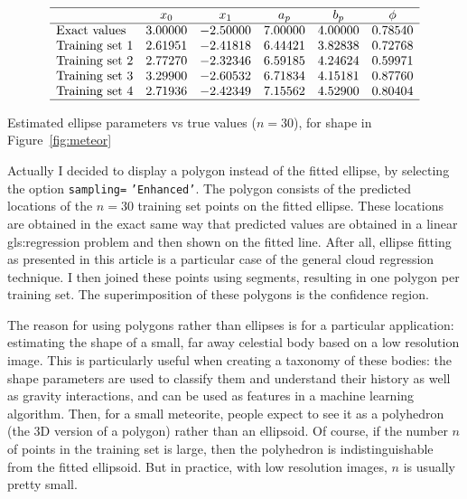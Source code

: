 \documentclass[oneside,10pt]{book}
\renewcommand{\arraystretch}{1.4} %
\begin{document}
\renewcommand{\arraystretch}{1.2} %
\begin{table}[H]
\[
\begin{array}{lccccc}
\hline
   & x_0 & x_1  & a_p & b_p & \phi  \\
\hline
\text{Exact values} & 3.00000 & -2.50000 & 7.00000 & 4.00000 & 0.78540\\
\text{Training set } 1 & 2.61951 & -2.41818 & 6.44421 & 3.82838 & 0.72768 \\
\text{Training set } 2 & 2.77270 & -2.32346 & 6.59185 & 4.24624 & 0.59971 \\
\text{Training set } 3 & 3.29900 & -2.60532 & 6.71834 & 4.15181 & 0.87760 \\
\text{Training set } 4 & 2.71936 & -2.42349 & 7.15562 & 4.52900 & 0.80404 \\
\hline
\end{array}
\]
\caption{\label{ellipar} Estimated ellipse parameters vs true values ($n=30$), for shape in Figure~\ref{fig:meteor}}
\end{table}
\renewcommand{\arraystretch}{1.0} %

Actually I decided to display a polygon instead of the fitted ellipse, by selecting the option \texttt{sampling=} \texttt{'Enhanced'}. The polygon consists of the predicted locations of the $n=30$ training set points on the fitted ellipse. These locations are obtained in the exact same way that predicted values are obtained in a linear \gls{gls:regression} problem and then shown on the fitted line. After all, ellipse fitting as presented in this article is a particular case of the general cloud regression technique. I then joined these points using segments, resulting in one polygon per training set. The superimposition of these polygons is the confidence region. 

The reason for using polygons rather than ellipses is for a particular application: estimating the shape of a small, far away celestial body based on a low resolution image.  This is particularly useful when creating a taxonomy of these bodies: the shape parameters are used to classify them and understand their history as well as gravity interactions, and can be used as features
 in a machine learning algorithm. Then, for a small meteorite, people expect to see it as a polyhedron (the 3D version of a polygon) rather than an ellipsoid. Of course, if the number $n$ of points in the training set is large, then the polyhedron is indistinguishable  from the fitted ellipsoid. But in practice, with low resolution images,  $n$ is usually pretty small. 
\end{document}
